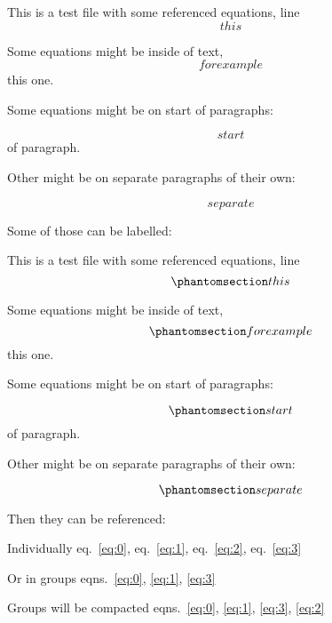 This is a test file with some referenced equations, line
\begin{equation}{ this }\end{equation}

Some equations might be inside of text,
\begin{equation}{ for example }\end{equation} this one.

Some equations might be on start of paragraphs:

\begin{equation}{ start }\end{equation} of paragraph.

Other might be on separate paragraphs of their own:

\begin{equation}{ separate }\end{equation}

Some of those can be labelled:

This is a test file with some referenced equations, line
\begin{equation}\phantomsection\label{eq:0}{ this }\label{eq:0}\end{equation}

Some equations might be inside of text,
\begin{equation}\phantomsection\label{eq:1}{ for example }\label{eq:1}\end{equation}
this one.

Some equations might be on start of paragraphs:

\begin{equation}\phantomsection\label{eq:2}{ start }\label{eq:2}\end{equation}
of paragraph.

Other might be on separate paragraphs of their own:

\begin{equation}\phantomsection\label{eq:3}{ separate }\label{eq:3}\end{equation}

Then they can be referenced:

Individually eq.~\ref{eq:0}, eq.~\ref{eq:1}, eq.~\ref{eq:2},
eq.~\ref{eq:3}

Or in groups eqns.~\ref{eq:0}, \ref{eq:1}, \ref{eq:3}

Groups will be compacted
eqns.~\ref{eq:0}, \ref{eq:1}, \ref{eq:3}, \ref{eq:2}
